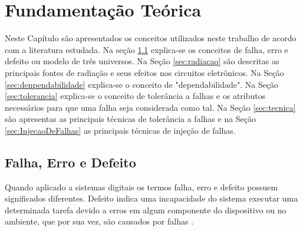 \chapter{Fundamentação Teórica}\label{cap:funTeorica}

Neste Capítulo são apresentados os conceitos utilizados neste trabalho de acordo com a literatura estudada. Na seção \ref{sec:falhaErroDefeito} explica-se os conceitos de falha, erro e defeito ou modelo de três universos. Na Seção \ref{sec:radiacao} são descritas as principais fontes de radiação e seus efeitos nos circuitos eletrônicos. Na Seção \ref{sec:denpendabilidade} explica-se o conceito de "dependabilidade". Na Seção \ref{sec:tolerancia} explica-se o conceito de tolerância a falhas e os atributos necessários para que uma falha seja considerada como tal. Na Seção \ref{sec:tecnica} são apresentas as principais técnicas de tolerância a falhas e na Seção \ref{sec:InjecaoDeFalhas} as principais técnicas de injeção de falhas.

\section{Falha, Erro e Defeito} \label{sec:falhaErroDefeito}

Quando aplicado a sistemas digitais os termos falha, erro e defeito possuem significados diferentes. Defeito indica uma incapacidade do sistema executar uma determinada tarefa devido a erros em algum componente do dispositivo ou no ambiente, que por sua vez, são causados por falhas \cite{Nelson:1990}.

